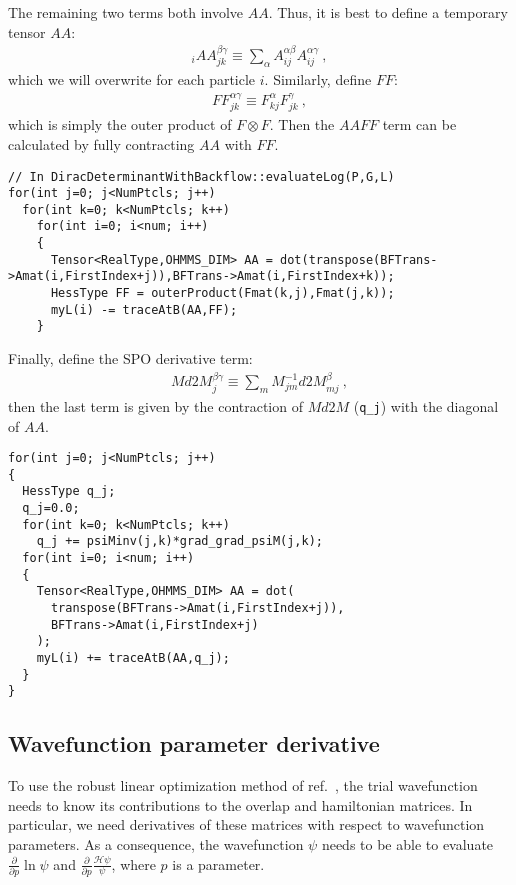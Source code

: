 The remaining two terms both involve $AA$. Thus, it is best to define a temporary tensor $AA$:
\begin{align}
{}_iAA_{jk}^{\beta\gamma} \equiv \sum\limits_\alpha A_{ij}^{\alpha\beta} A_{ij}^{\alpha\gamma}\:,
\end{align}
which we will overwrite for each particle $i$. Similarly, define $FF$:
\begin{align}
FF_{jk}^{\alpha\gamma} \equiv F_{kj}^\alpha F_{jk}^\gamma\:,
\end{align}
which is simply the outer product of $F\otimes F$. Then the $AAFF$ term can be calculated by fully contracting $AA$ with $FF$.
\begin{lstlisting}
// In DiracDeterminantWithBackflow::evaluateLog(P,G,L)
for(int j=0; j<NumPtcls; j++)
  for(int k=0; k<NumPtcls; k++)
    for(int i=0; i<num; i++)
    {
      Tensor<RealType,OHMMS_DIM> AA = dot(transpose(BFTrans->Amat(i,FirstIndex+j)),BFTrans->Amat(i,FirstIndex+k));
      HessType FF = outerProduct(Fmat(k,j),Fmat(j,k));
      myL(i) -= traceAtB(AA,FF);
    }
\end{lstlisting}
Finally, define the SPO derivative term:
\begin{align}
Md2M_j^{\beta\gamma} \equiv \sum\limits_m M^{-1}_{jm} d2M_{mj}^\beta\:,
\end{align}
then the last term is given by the contraction of $Md2M$ (\verb|q_j|) with the diagonal of $AA$.
\begin{lstlisting}
for(int j=0; j<NumPtcls; j++)
{
  HessType q_j;
  q_j=0.0;
  for(int k=0; k<NumPtcls; k++)
    q_j += psiMinv(j,k)*grad_grad_psiM(j,k);
  for(int i=0; i<num; i++)
  {
    Tensor<RealType,OHMMS_DIM> AA = dot(
      transpose(BFTrans->Amat(i,FirstIndex+j)),
      BFTrans->Amat(i,FirstIndex+j)
    );
    myL(i) += traceAtB(AA,q_j);
  }
}
\end{lstlisting}

\subsection{Wavefunction parameter derivative}
To use the robust linear optimization method of ref.~\cite{Toulouse2007linear}, the trial wavefunction needs to know its contributions to the overlap and hamiltonian matrices. In particular, we need derivatives of these matrices with respect to wavefunction parameters. As a consequence, the wavefunction $\psi$ needs to be able to evaluate $\frac{\partial}{\partial p} \ln \psi$ and $\frac{\partial}{\partial p} \frac{\mathcal{H}\psi}{\psi}$, where $p$ is a parameter.

